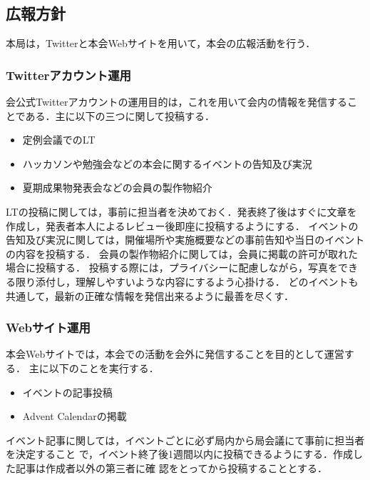 \subsection*{広報方針}

本局は，Twitterと本会Webサイトを用いて，本会の広報活動を行う．

\subsubsection*{Twitterアカウント運用}
会公式Twitterアカウントの運用目的は，これを用いて会内の情報を発信することである．主に以下の三つに関して投稿する．
\begin{itemize}
    \item 定例会議でのLT
    \item ハッカソンや勉強会などの本会に関するイベントの告知及び実況
    \item 夏期成果物発表会などの会員の製作物紹介
\end{itemize}

LTの投稿に関しては，事前に担当者を決めておく．発表終了後はすぐに文章を作成し，発表者本人によるレビュー後即座に投稿するようにする．
イベントの告知及び実況に関しては，開催場所や実施概要などの事前告知や当日のイベントの内容を投稿する．
会員の製作物紹介に関しては，会員に掲載の許可が取れた場合に投稿する．
投稿する際には，プライバシーに配慮しながら，写真をできる限り添付し，理解しやすいような内容にするよう心掛ける．
どのイベントも共通して，最新の正確な情報を発信出来るように最善を尽くす．

\subsubsection*{Webサイト運用}
本会Webサイトでは，本会での活動を会外に発信することを目的として運営する．
主に以下のことを実行する．
\begin{itemize}
    \item イベントの記事投稿
    \item Advent Calendarの掲載
\end{itemize}

イベント記事に関しては，イベントごとに必ず局内から局会議にて事前に担当者を決定すること
で，イベント終了後1週間以内に投稿できるようにする．作成した記事は作成者以外の第三者に確
認をとってから投稿することとする．